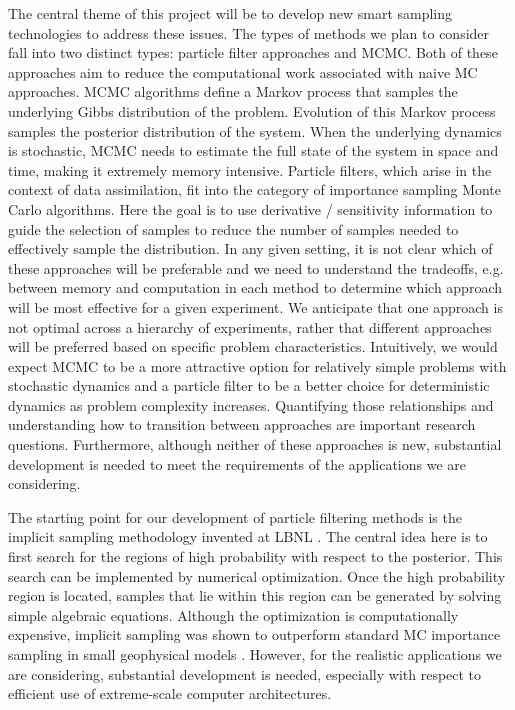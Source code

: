 \documentclass[11pt]{article}
\newcommand{\MarginPar}[1]{\marginpar{%
\vskip-\baselineskip %
\raggedright\tiny\sffamily
\hrule\smallskip{\color{red}#1}\par\smallskip\hrule}}
\begin{document}
The central theme of this project will be to develop new smart sampling technologies 
to address these issues.
The types of methods we plan to consider fall into two distinct types:  particle filter approaches
and MCMC.
Both of these approaches aim to reduce the computational work associated with naive MC approaches.
MCMC algorithms define a Markov
process that samples the underlying Gibbs distribution of the problem. 
Evolution of this Markov process
samples the posterior distribution of the system.
When the underlying dynamics is stochastic, MCMC needs to estimate
\MarginPar{JBB:  is this correct? Jonathan?}
the full state of the system in space and time, making it extremely memory intensive.
Particle filters, which arise in the context of data assimilation,
fit into the category of importance sampling Monte Carlo algorithms.  Here the goal is to use
derivative / sensitivity information to guide the selection of samples to reduce the number of samples
needed to effectively sample the distribution.
In any given setting, it is not clear which of these approaches will be preferable and
we need to understand the tradeoffs, e.g. between memory and computation
in each method to determine which approach will be most effective for a given experiment.
We anticipate that one approach is not optimal across a hierarchy of experiments, rather
that different approaches will be preferred based on specific problem characteristics. Intuitively,
we would expect MCMC to be a more attractive option for relatively simple problems with stochastic dynamics and a particle
filter to be a better choice for deterministic dynamics as problem complexity increases. Quantifying those relationships
and understanding how to transition between approaches are important research questions.
Furthermore, although neither of these approaches is new, substantial development is needed to meet the requirements
of the applications we are considering.

The starting point for our development of particle filtering methods is the implicit sampling methodology invented at LBNL \cite{chorintupnas,chorin2010,Morzfeld2011,Morzfeld2012,Atkins2013}.
The central idea here is to first search for the regions of high probability with respect to the posterior.
This search can be implemented by numerical optimization.
Once the high probability region is located, samples that lie within this region can be generated by solving simple algebraic equations.
Although the optimization is computationally expensive, implicit sampling was shown to outperform standard MC importance sampling in small geophysical models \cite{Morzfeld2011,Morzfeld2012,Atkins2013}. 
However, for the realistic applications we are considering, substantial development is needed, especially with respect to efficient use of extreme-scale computer architectures. 
\end{document}
